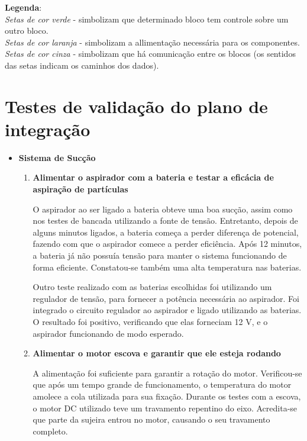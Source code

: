    	\noindent \textbf{Legenda}: \\
   	\noindent \textit{Setas de cor verde} - simbolizam que determinado bloco tem controle sobre um outro bloco. \\
   	\noindent \textit{Setas de cor laranja} - simbolizam a allimentação necessária para os componentes. \\
   	\noindent \textit{Setas de cor cinza} - simbolizam que há comunicação entre os blocos (os sentidos das setas indicam os caminhos dos dados).

\section{Testes de validação do plano de integração}
\label{sub:validação_plano_integração}
   \begin{itemize}
   		\item \textbf{Sistema de Sucção}

   			\begin{enumerate}
		      \item \textbf{Alimentar o aspirador com a bateria e testar a eficácia de aspiração de partículas}

		         O aspirador ao ser ligado a bateria obteve uma boa sucção, assim como nos testes de bancada utilizando a fonte de tensão. Entretanto, depois de alguns minutos ligados, a bateria começa a perder diferença de potencial, fazendo com que o aspirador comece a perder eficiência. Após 12 minutos, a bateria já não possuía tensão para manter o sistema funcionando de forma eficiente. Constatou-se também uma alta temperatura nas baterias.

		         Outro teste realizado com as baterias escolhidas foi utilizando um regulador de tensão, para fornecer a potência necessária ao aspirador. Foi integrado o circuito regulador ao aspirador e ligado utilizando as baterias. O resultado foi positivo, verificando que elas forneciam 12 V, e o aspirador funcionando de modo esperado.

		      \item \textbf{Alimentar o motor escova e garantir que ele esteja rodando}

		         A alimentação foi suficiente para garantir a rotação do motor. Verificou-se que após um tempo grande de funcionamento, o temperatura do motor amolece a cola utilizada para sua fixação. Durante os testes com a escova, o motor DC utilizado teve um travamento repentino do eixo. Acredita-se que parte da sujeira entrou no motor, causando o seu travamento completo.


\end{enumerate}
\end{itemize}
